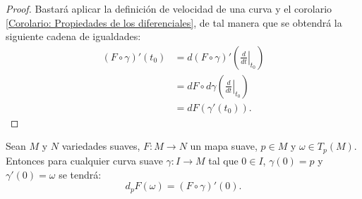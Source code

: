 \begin{proof}
	Bastará aplicar la definición de velocidad de una curva y el corolario \ref{Corolario: Propiedades de los diferenciales}, de tal manera que se obtendrá la siguiente cadena de igualdades:
	\begin{align*}
		(F \circ \gamma)'(t_0) & = d(F \circ \gamma)'
		\left(\left. \frac{d}{dt}\right|_{t_0} \right)                                              \\
		                       & = dF \circ d \gamma \left( \left. \frac{d}{dt}\right|_{t_0}\right) \\
		                       & = dF(\gamma'(t_0)).
	\end{align*}
\end{proof}

\begin{corollary}
	Sean $M$ y $N$ variedades suaves, $F: M \to N$ un mapa suave, $p \in M$ y $\omega \in T_p(M)$. Entonces para cualquier curva suave $\gamma: I \to M$ tal que $0 \in I$, $\gamma(0) = p$ y $\gamma'(0) = \omega$ se tendrá:
	\[
		d_pF(\omega) = (F \circ \gamma)'(0).
	\]
\end{corollary}
